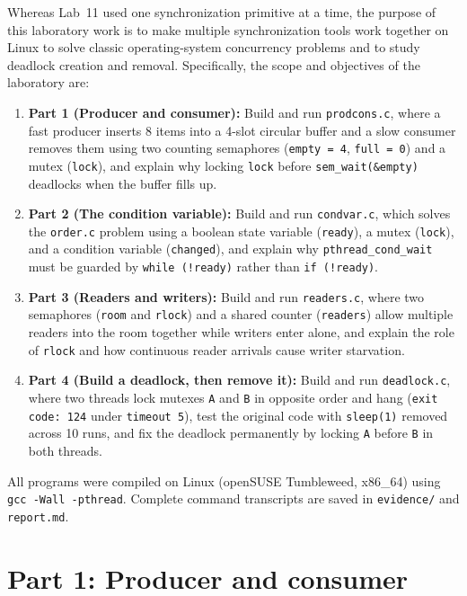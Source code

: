 \documentclass{../latex/utmreport}
\providecommand{\tightlist}{\setlength{\itemsep}{0pt}\setlength{\parskip}{0pt}}
\begin{document}
Whereas Lab~11 used one synchronization primitive at a time, the purpose of this laboratory work is to make multiple synchronization tools work together on Linux to solve classic operating-system concurrency problems and to study deadlock creation and removal. Specifically, the scope and objectives of the laboratory are:
\begin{enumerate}
\tightlist
\item \textbf{Part 1 (Producer and consumer):} Build and run \texttt{prodcons.c}, where a fast producer inserts 8 items into a 4-slot circular buffer and a slow consumer removes them using two counting semaphores (\texttt{empty = 4}, \texttt{full = 0}) and a mutex (\texttt{lock}), and explain why locking \texttt{lock} before \texttt{sem\_wait(\&empty)} deadlocks when the buffer fills up.
\item \textbf{Part 2 (The condition variable):} Build and run \texttt{condvar.c}, which solves the \texttt{order.c} problem using a boolean state variable (\texttt{ready}), a mutex (\texttt{lock}), and a condition variable (\texttt{changed}), and explain why \texttt{pthread\_cond\_wait} must be guarded by \texttt{while (!ready)} rather than \texttt{if (!ready)}.
\item \textbf{Part 3 (Readers and writers):} Build and run \texttt{readers.c}, where two semaphores (\texttt{room} and \texttt{rlock}) and a shared counter (\texttt{readers}) allow multiple readers into the room together while writers enter alone, and explain the role of \texttt{rlock} and how continuous reader arrivals cause writer starvation.
\item \textbf{Part 4 (Build a deadlock, then remove it):} Build and run \texttt{deadlock.c}, where two threads lock mutexes \texttt{A} and \texttt{B} in opposite order and hang (\texttt{exit code: 124} under \texttt{timeout 5}), test the original code with \texttt{sleep(1)} removed across 10 runs, and fix the deadlock permanently by locking \texttt{A} before \texttt{B} in both threads.
\end{enumerate}

All programs were compiled on Linux (openSUSE Tumbleweed, x86\_64) using \texttt{gcc -Wall -pthread}. Complete command transcripts are saved in \texttt{evidence/} and \texttt{report.md}.

\chapter{Part 1: Producer and consumer}
\end{document}
